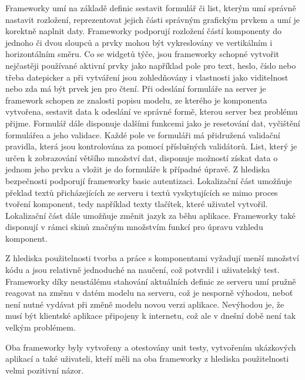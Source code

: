 Frameworky umí na základě definic sestavit formulář či list, kterým umí správně nastavit rozložení, reprezentovat jejich části správným grafickým prvkem a umí je korektně naplnit daty. Frameworky podporují rozložení částí komponenty do jednoho či dvou sloupců a prvky mohou být vykreslovány ve vertikálním i horizontálním směru. Co se widgetů týče, jsou frameworky schopné vytvořit nejčastěji používané aktivní prvky jako například pole pro text, heslo, číslo nebo třeba datepicker a při vytváření jsou zohledňovány i vlastnosti jako viditelnost nebo zda má být prvek jen pro čtení. Při odeslání formuláře na server je framework schopen ze znalosti popisu modelu, ze kterého je komponenta vytvořena, sestavit data k odeslání ve správné formě, kterou server bez problému přijme. Formulář dále disponuje dalšími funkcemi jako je resetování dat, vyčištění formulářea a jeho validace. Každé pole ve formuláři má přidružená validační pravidla, která jsou kontrolována za pomocí příslušných validátorů. List, který je určen k zobrazování většího množství dat, disponuje možností získat data o jednom jeho prvku a vložit je do formuláře k případné úpravě. Z hlediska bezpečnosti podporují frameworky basic autentizaci. Lokalizační část umožňuje překlad textů přicházejících ze serveru i textů vyskytujících se mimo proces tvoření komponent, tedy například texty tlačítek, které uživatel vytvořil. Lokalizační část dále umožňuje změnit jazyk za běhu aplikace. Frameworky také disponují v rámci skinů značným množstvím funkcí pro úpravu vzhledu komponent.

Z hlediska použitelnosti tvorba a práce s komponentami vyžadují menší množství kódu a jsou relativně jednoduché na naučení, což potvrdil i uživatelský test. Frameworky díky neustálému stahování aktuálních definic ze serveru umí pružně reagovat na změnu v datém modelu na serveru, což je nesporně výhodou, neboť není nutné vydávat při změně modelu novou verzi aplikace. Nevýhodou je, že musí být klientské aplikace připojeny k internetu, což ale v dnešní době není tak velkým problémem. 

Oba frameworky byly vytvořeny a otestovány unit testy, vytvořením ukázkových aplikací a také uživateli, kteří měli na oba frameworky z hlediska použitelnosti velmi pozitivní názor.